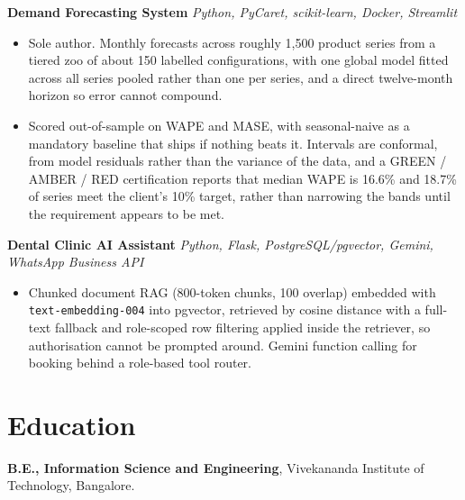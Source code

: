 \documentclass[10pt,a4paper]{article}
\begin{document}
\vspace{1pt}
\textbf{Demand Forecasting System} \textit{Python, PyCaret, scikit-learn, Docker, Streamlit}
\begin{itemize}
  \item Sole author. Monthly forecasts across roughly 1,500 product series from a tiered zoo of about
        150 labelled configurations, with one global model fitted across all series pooled rather
        than one per series, and a direct twelve-month horizon so error cannot compound.
  \item Scored out-of-sample on WAPE and MASE, with seasonal-naive as a mandatory baseline that ships
        if nothing beats it. Intervals are conformal, from model residuals rather than the variance
        of the data, and a GREEN / AMBER / RED certification reports that median WAPE is 16.6\% and
        18.7\% of series meet the client's 10\% target, rather than narrowing the bands until the
        requirement appears to be met.
\end{itemize}

\vspace{1pt}
\textbf{Dental Clinic AI Assistant} \textit{Python, Flask, PostgreSQL/pgvector, Gemini, WhatsApp Business API}
\begin{itemize}
  \item Chunked document RAG (800-token chunks, 100 overlap) embedded with
        \texttt{text-embedding-004} into pgvector, retrieved by cosine distance with a full-text
        fallback and role-scoped row filtering applied inside the retriever, so authorisation cannot
        be prompted around. Gemini function calling for booking behind a role-based tool router.
\end{itemize}

\section{Education}
\textbf{B.E., Information Science and Engineering}, Vivekananda Institute of Technology, Bangalore.
\end{document}
